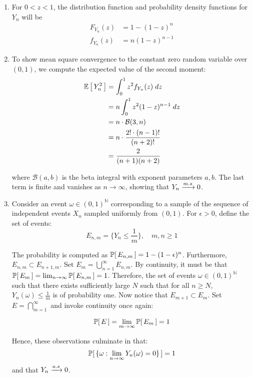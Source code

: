\documentclass[12pt]{article}%
\begin{document}
\begin{enumerate}
  \item For $0 < z < 1$, the distribution function and probability density functions for $Y_n$ will be
  \begin{align*}
      F_{Y_n}(z) & = 1 - (1-z)^n \\
      f_{Y_n}(z) & = n(1-z)^{n-1}
  \end{align*}

  \item
  To show mean square convergence to the constant zero random variable over $(0,1)$, we compute the expected value of the second moment:
  \begin{align*}
      \mathbb{E}\left[\,Y_n^2\,\right] & = \int_0^1 z^2 f_{Y_n}(z) \; dz \\
      & = n \int_0^1 z^2(1-z)^{n-1} \; dz \\
      & = n \cdot \mathcal{B}(3,n) \\
      & = n \cdot \frac{2!\cdot(n-1)!}{(n+2)!} \\
      & = \frac{2}{(n+1)(n+2)}
  \end{align*}

  where $\mathcal{B}(a,b)$ is the beta integral with exponent parameters $a,b$. The last term is finite and vanishes as $n \rightarrow \infty$, showing that $Y_n \xrightarrow[]{m.s} 0$.

  \item
  Consider an event $\omega \in (0,1)^\mathbb{N}$ corresponding to a sample of the sequence of independent events $X_n$ sampled uniformly from $(0,1)$. For $\epsilon > 0$, define the set of events:
  \[ E_{n,m} = \{Y_n \leq \frac{1}{m}\}, \quad m, n \geq 1 \]

  The probability is computed as $\mathbb{P}[\,E_{n,m}\,] = 1 - (1 - \epsilon)^n$. Furthermore, $E_{n,m} \subset E_{n+1,m}$. Set $E_m = \bigcup_{n=1}^\infty E_{n,m}$. By continuity, it must be that $\mathbb{P}[\,E_m\,] = \lim_{n \rightarrow \infty} \mathbb{P}[\,E_{n,m}\,] = 1$. Therefore, the set of events $\omega\in (0,1)^\mathbb{N}$ such that there exists sufficiently large $N$ such that for all $n \geq N$, $Y_n(\omega) \leq \frac{1}{m}$ is of probability one. Now notice that $E_{m+1} \subset E_m$. Set $E = \bigcap_{m=1}^\infty$ and invoke continuity once again:

  \[\mathbb{P}[\,E\,] = \lim_{m \rightarrow \infty} \mathbb{P}[\,E_m\,] = 1 \]

  Hence, these observations culminate in that:
    \[\mathbb{P}[\,\{\omega:\lim_{n \rightarrow \infty} Y_n(\omega) = 0\}\,] = 1 \] and that $Y_n \xrightarrow[]{a.s} 0$.
\end{enumerate}
\end{document}
